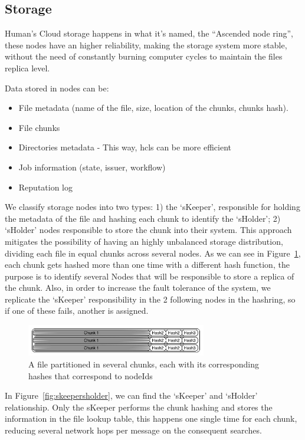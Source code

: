 \subsection{Storage}

Human's Cloud storage happens in what it's named, the ``Ascended node ring'', these nodes have an higher reliability, making the storage system more stable, without the need of constantly burning computer cycles to maintain the files replica level.

Data stored in nodes can be:
\begin{itemize}
  \item File metadata (name of the file, size, location of the chunks, chunks hash).
  \item File chunks
  \item Directories metadata - This way, hcls can be more efficient 
  \item Job information (state, issuer, workflow)
  \item Reputation log
\end{itemize}

We classify storage nodes into two types: 1) the `sKeeper', responsible for holding the metadata of the file and hashing each chunk to identify the `sHolder'; 2) `sHolder' nodes responsible to store the chunk into their system. This approach mitigates the possibility of having an highly unbalanced storage distribution, dividing each file in equal chunks across several nodes. As we can see in Figure~\ref{fig:chunking}, each chunk gets hashed more than one time with a different hash function, the purpose is to identify several Nodes that will be responsible to store a replica of the chunk. Also, in order to increase the fault tolerance of the system, we replicate the `sKeeper' responsibility in the 2 following nodes in the hashring, so if one of these fails, another is assigned.

\begin{figure}[h!]
  \centering
  \includegraphics[width=0.7\textwidth]{img/chunking.jpg}
  \caption{A file partitioned in several chunks, each with its corresponding hashes that correspond to nodeIds}
  \label{fig:chunking}
\end{figure}

In Figure~\ref{fig:skeepersholder}, we can find the `sKeeper' and `sHolder' relationship. Only the sKeeper performs the chunk hashing and stores the information in the file lookup table, this happens one single time for each chunk, reducing several network hops per message on the consequent searches.

